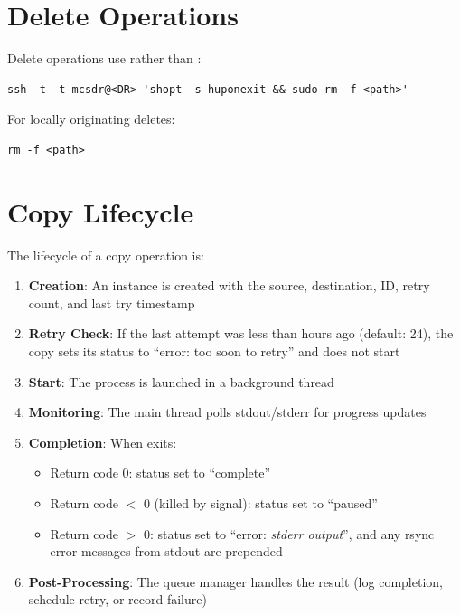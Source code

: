 \section{Delete Operations}

Delete operations use  rather than :

\begin{lstlisting}
ssh -t -t mcsdr@<DR> 'shopt -s huponexit && sudo rm -f <path>'
\end{lstlisting}

For locally originating deletes:
\begin{lstlisting}
rm -f <path>
\end{lstlisting}

\section{Copy Lifecycle}

The lifecycle of a copy operation is:

\begin{enumerate}
    \item \textbf{Creation}: An  instance is created with the source, destination, ID, retry count, and last try timestamp
    \item \textbf{Retry Check}: If the last attempt was less than  hours ago (default: 24), the copy sets its status to ``error: too soon to retry'' and does not start
    \item \textbf{Start}: The  process is launched in a background thread
    \item \textbf{Monitoring}: The main thread polls  stdout/stderr for progress updates
    \item \textbf{Completion}: When  exits:
    \begin{itemize}
        \item Return code 0: status set to ``complete''
        \item Return code $<$ 0 (killed by signal): status set to ``paused''
        \item Return code $>$ 0: status set to ``error: \textit{stderr output}'', and any rsync error messages from stdout are prepended
    \end{itemize}
    \item \textbf{Post-Processing}: The queue manager handles the result (log completion, schedule retry, or record failure)
\end{enumerate}
